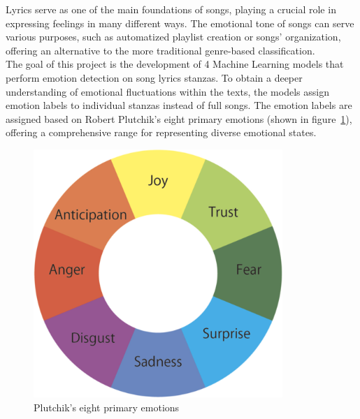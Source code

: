 Lyrics serve as one of the main foundations of songs, playing a crucial role in expressing feelings in many different ways. The emotional tone of songs can serve various purposes, such as automatized playlist creation or songs' organization,
offering an alternative to the more traditional genre-based classification. \\
The goal of this project is the development of 4 Machine Learning models that perform emotion detection on song lyrics stanzas. To obtain a deeper understanding of emotional fluctuations within the texts, the models assign emotion labels to individual stanzas instead of full songs.
The emotion labels are assigned based on Robert Plutchik's eight primary emotions (shown in figure~\ref{fig:primary_emotions}), offering a comprehensive range for representing diverse emotional states.\\
\begin{figure}[H]
    \centering
    \includegraphics[scale= 0.30]{pictures/plutchik_primary_emotions.png}
    \caption{Plutchik's eight primary emotions}
    \label{fig:primary_emotions}
\end{figure}

